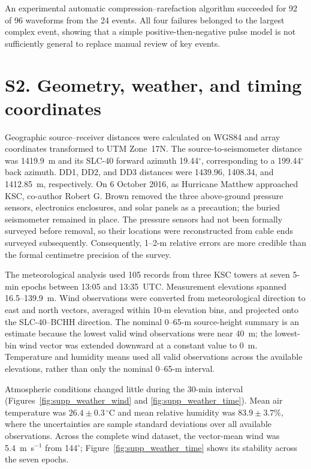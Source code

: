 \documentclass[]{seismica}
\begin{document}
An experimental automatic compression--rarefaction algorithm succeeded for
92 of 96 waveforms from the 24 events. All four failures belonged to the
largest complex event, showing that a simple positive-then-negative pulse model
is not sufficiently general to replace manual review of key events.

\FloatBarrier

\section*{S2. Geometry, weather, and timing coordinates}
\label{sec:supp_weather}

Geographic source--receiver distances were calculated on WGS84 and array
coordinates transformed to UTM Zone~17N. The source-to-seismometer distance
was 1419.9~m and its SLC-40 forward azimuth 19.44$^\circ$, corresponding to a
199.44$^\circ$ back azimuth. DD1, DD2, and DD3 distances were 1439.96,
1408.34, and 1412.85~m, respectively. On 6 October 2016, as Hurricane Matthew approached
KSC, co-author Robert G. Brown removed the three above-ground pressure sensors,
electronics enclosures, and solar panels as a precaution; the buried
seismometer remained in place. The pressure sensors had not been formally
surveyed before removal, so their locations were reconstructed from cable ends
surveyed subsequently. Consequently, 1--2-m relative errors are more credible
than the formal centimetre precision of the survey.

The meteorological analysis used 105 records from three KSC towers at seven
5-min epochs between 13:05 and 13:35~UTC. Measurement elevations spanned
16.5--139.9~m. Wind observations were converted from meteorological direction
to east and north vectors, averaged within 10-m elevation bins, and projected
onto the SLC-40--BCHH direction. The nominal 0--65-m source-height summary is
an estimate because the lowest valid wind observations were near 40~m; the
lowest-bin wind vector was extended downward at a constant value to 0~m.
Temperature and humidity means used all valid observations across the
available elevations, rather than only the nominal 0--65-m interval.

Atmospheric conditions changed little during the 30-min interval
(Figures~\ref{fig:supp_weather_wind} and
\ref{fig:supp_weather_time}). Mean air temperature was
$26.4\pm0.3\,^{\circ}$C and mean relative humidity was
$83.9\pm3.7\%$, where the uncertainties are sample standard deviations over
all available observations. Across the complete wind dataset, the vector-mean
wind was 5.4~m~s$^{-1}$ from 144$^\circ$; Figure~\ref{fig:supp_weather_time}
shows its stability across the seven epochs.
\end{document}
